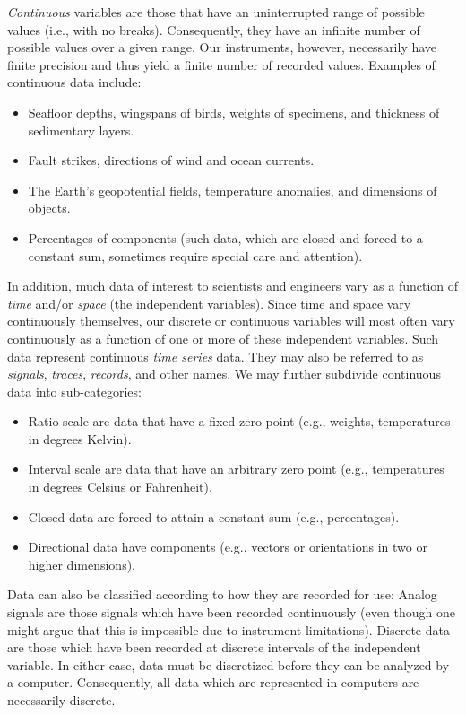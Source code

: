 	\emph{Continuous} variables are those that have an uninterrupted range of possible values (i.e., with 
no breaks).
Consequently, they have an infinite number of possible values over a given range.  Our instruments, however,
necessarily have finite precision and thus yield a finite number of recorded values.  Examples 
of continuous data include:

\begin{itemize}
\item	Seafloor depths, wingspans of birds, weights of specimens, and thickness of sedimentary layers.
\item	Fault strikes, directions of wind and ocean currents.
\item	The Earth's geopotential fields, temperature anomalies, and dimensions of objects.
\item 	Percentages of components (such data, which are closed and forced to a constant sum, sometimes 
require special care and attention).
\end{itemize}

	In addition, much data of interest to scientists and engineers vary as a function of \emph{time} and/or \emph{space} 
(the independent variables).  Since time and space vary continuously themselves, our discrete or 
continuous variables will most often vary continuously as a function of one or more of these independent 
variables.  Such data represent continuous \emph{time series} data.  They may also be referred to as 
\emph{signals}, \emph{traces}, \emph{records}, and other names.  We may further subdivide continuous data into sub-categories:
\begin{itemize}
\item	Ratio scale are data that have a fixed zero point (e.g., weights, temperatures in degrees Kelvin).
\item	Interval scale are data that have an arbitrary zero point (e.g., temperatures in degrees Celsius or
Fahrenheit).
\item	Closed data are forced to attain a constant sum (e.g., percentages).
\item 	Directional data have components (e.g., vectors or orientations in two or higher dimensions).
\end{itemize}

	Data can also be classified according to how they are recorded for use:  
Analog signals are those signals which have been recorded continuously (even though one might 
argue that this is impossible due to instrument limitations).  Discrete data are those which have been
recorded at discrete intervals of the independent variable.
In either case, data must be discretized before they can be analyzed by a computer.  Consequently, all
data which are represented in computers are necessarily discrete.

